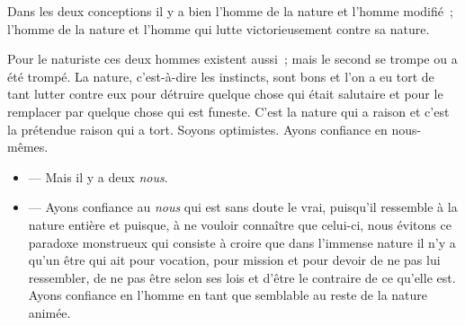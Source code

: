 \documentclass[french,twoside]{book} %
\begin{document}
Dans les deux conceptions il y a bien l’homme de la nature et l’homme modifié ; l’homme de la nature et l’homme qui lutte victorieusement contre sa nature.\par
Pour le naturiste ces deux hommes existent aussi ; mais le second se trompe ou a été trompé. La nature, c’est-à-dire les instincts, sont bons et l’on a eu tort de tant lutter contre eux pour détruire quelque chose qui était salutaire et pour le remplacer par quelque chose qui est funeste. C’est la nature qui a raison et c’est la prétendue raison qui a tort. Soyons optimistes. Ayons confiance en nous-mêmes.\par

\begin{itemize}[itemsep=0pt,]
\item  — Mais il y a deux {\itshape nous}.
\item  — Ayons confiance au {\itshape nous} qui est sans doute le vrai, puisqu’il ressemble à la nature entière et puisque, à ne vouloir connaître que celui-ci, nous évitons ce paradoxe monstrueux qui consiste à croire que dans l’immense nature il n’y a qu’un être qui ait pour vocation, pour mission et pour devoir de ne pas lui ressembler, de ne pas être selon ses lois et d’être le contraire de ce qu’elle est. Ayons confiance en l’homme en tant que semblable au reste de la nature animée.
\end{itemize}
\end{document}
